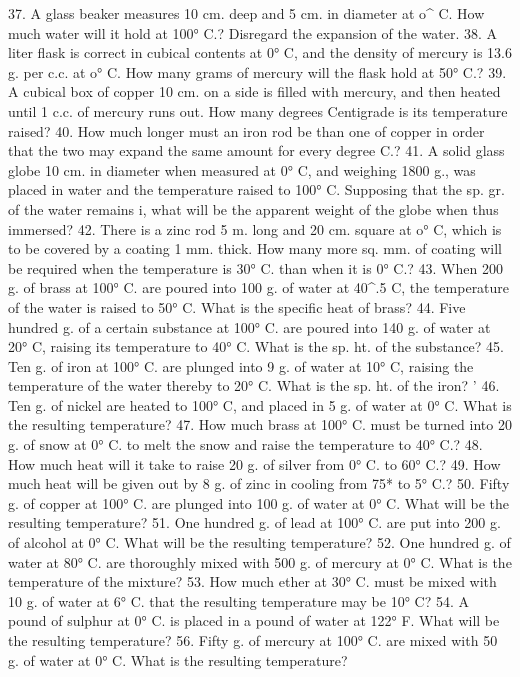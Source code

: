 37. A glass beaker measures 10 cm. deep and 5 cm. in diameter at o^ C. How much water will it hold at 100° C.? Disregard the expansion of the water.
38. A liter flask is correct in cubical contents at 0° C, and the density of mercury is 13.6 g. per c.c. at o° C. How many grams of mercury will the flask hold at 50° C.?
39. A cubical box of copper 10 cm. on a side is filled with mercury, and then heated until 1 c.c. of mercury runs out. How many degrees Centigrade is its temperature raised?
40. How much longer must an iron rod be than one of copper in order that the two may expand the same amount for every degree C.?
41. A solid glass globe 10 cm. in diameter when measured at 0° C, and weighing 1800 g., was placed in water and the temperature raised to 100° C. Supposing that the sp. gr. of the water remains i, what will be the apparent weight of the globe when thus immersed?
42. There is a zinc rod 5 m. long and 20 cm. square at o° C, which is to be covered by a coating 1 mm. thick. How many more sq. mm. of coating will be required when the temperature is 30° C. than when it is 0° C.?
43. When 200 g. of brass at 100° C. are poured into 100 g. of water at 40^.5 C, the temperature of the water is raised to 50° C. What is the specific heat of brass?
44. Five hundred g. of a certain substance at 100° C. are poured into 140 g. of water at 20° C, raising its temperature to 40° C. What is the sp. ht. of the substance?
45. Ten g. of iron at 100° C. are plunged into 9 g. of water at 10° C, raising the temperature of the water thereby to 20° C. What is the sp. ht. of the iron? '
46. Ten g. of nickel are heated to 100° C, and placed in 5 g. of water at 0° C. What is the resulting temperature?
47. How much brass at 100° C. must be turned into 20 g. of snow at 0° C. to melt the snow and raise the temperature to 40° C.?
48. How much heat will it take to raise 20 g. of silver from 0° C. to 60° C.?
49. How much heat will be given out by 8 g. of zinc in cooling from 75* to 5° C.?
50. Fifty g. of copper at 100° C. are plunged into 100 g. of water at 0° C. What will be the resulting temperature?
51. One hundred g. of lead at 100° C. are put into 200 g. of alcohol at 0° C. What will be the resulting temperature?
52. One hundred g. of water at 80° C. are thoroughly mixed with 500 g. of mercury at 0° C. What is the temperature of the mixture?
53. How much ether at 30° C. must be mixed with 10 g. of water at 6° C. that the resulting temperature may be 10° C?
54. A pound of sulphur at 0° C. is placed in a pound of water at 122° F. What will be the resulting temperature?
56. Fifty g. of mercury at 100° C. are mixed with 50 g. of water at 0° C. What is the resulting temperature?
